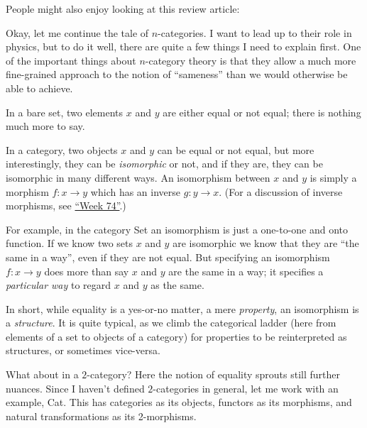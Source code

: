 \documentclass{article}
\def\tightlist{}
\renewcommand{\texttt}[1]{%
  \begingroup
  \ttfamily
  \begingroup\lccode`~=`/\lowercase{\endgroup\def~}{/\discretionary{}{}{}}%
  \begingroup\lccode`~=`[\lowercase{\endgroup\def~}{[\discretionary{}{}{}}%
  \begingroup\lccode`~=`.\lowercase{\endgroup\def~}{.\discretionary{}{}{}}%
  \catcode`/=\active\catcode`[=\active\catcode`.=\active
  \scantokens{#1\noexpand}%
  \endgroup
}
\begin{document}
People might also enjoy looking at this review article:


Okay, let me continue the tale of \(n\)-categories. I want to lead up to
their role in physics, but to do it well, there are quite a few things I
need to explain first. One of the important things about \(n\)-category
theory is that they allow a much more fine-grained approach to the
notion of ``sameness'' than we would otherwise be able to achieve.

In a bare set, two elements \(x\) and \(y\) are either equal or not
equal; there is nothing much more to say.

In a category, two objects \(x\) and \(y\) can be equal or not equal,
but more interestingly, they can be \emph{isomorphic} or not, and if
they are, they can be isomorphic in many different ways. An isomorphism
between \(x\) and \(y\) is simply a morphism \(f\colon x\to y\) which
has an inverse \(g\colon y\to x\). (For a discussion of inverse
morphisms, see \protect\hyperlink{week74}{``Week 74''}.)

For example, in the category Set an isomorphism is just a one-to-one and
onto function. If we know two sets \(x\) and \(y\) are isomorphic we
know that they are ``the same in a way'', even if they are not equal.
But specifying an isomorphism \(f\colon x\to y\) does more than say
\(x\) and \(y\) are the same in a way; it specifies a \emph{particular
way} to regard \(x\) and \(y\) as the same.

In short, while equality is a yes-or-no matter, a mere \emph{property},
an isomorphism is a \emph{structure}. It is quite typical, as we climb
the categorical ladder (here from elements of a set to objects of a
category) for properties to be reinterpreted as structures, or sometimes
vice-versa.

What about in a \(2\)-category? Here the notion of equality sprouts
still further nuances. Since I haven't defined \(2\)-categories in
general, let me work with an example, Cat. This has categories as its
objects, functors as its morphisms, and natural transformations as its
2-morphisms.
\end{document}

